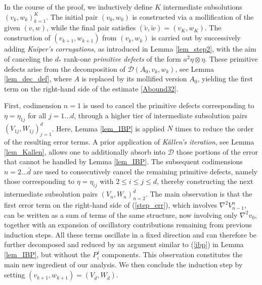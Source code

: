\documentclass[reqno,twoside,11pt]{amsart}
\numberwithin{equation}{section}
\theoremstyle{plain}
\theoremstyle{definition}
\begin{document}
\medskip

\noindent In the course of the proof, we inductively define $K$
intermediate subsolutions ${(v_k, w_k)}_{k=1}^K$. The initial pair
$(v_0, w_0)$ is constructed via a mollification of the given $(v,w)$,
while the final pair satisfies $(\tilde v, \tilde w) = (v_K, w_K)$. 
The construction of $(v_{k+1}, w_{k+1})$ from $(v_k, w_k)$ is carried
out by successively adding {\em Kuiper's corrugations}, as introduced
in Lemma \ref{lem_step2}, with the aim of canceling the $d_*$ rank-one
{\em primitive defects} of the form $a^2 \eta \otimes \eta$. These
primitive defects arise from the decomposition of 
$\mathcal{D}(A_0, v_k, w_k)$, see Lemma \ref{lem_dec_def}, where $A$
is replaced by its mollified version $A_0$, yielding the first term on
the right-hand side of the estimate \ref{Abound32}. 

\medskip

\noindent First, codimension $n=1$ is used to cancel the primitive
defects corresponding to $\eta = \eta_{1j}$ for all $j=1\ldots d$,
through a higher tier of intermediate subsolution pairs ${(V_{1j},
  W_{1j})}_{j=1}^d$. Here, Lemma \ref{lem_IBP} is applied $N$ times to
reduce the order of the resulting error terms. A prior application of
{\em K\"allen's iteration}, see Lemma \ref{lem_Kallen}, allows one to
additionally absorb into $\mathcal{D}$ those portions of the error
that cannot be handled by Lemma \ref{lem_IBP}. 
The subsequent codimensions $n=2 \ldots\bar d$ are 
used to consecutively cancel the remaining primitive defects, namely
those corresponding to $\eta = \eta_{ij}$ with $2 \leq i \leq j \leq d$, 
thereby constructing the next intermediate subsolution pairs ${(V_n, W_n)}_{n=2}^{\bar d}$.  
The main observation is that the first error term on the right-hand
side of (\ref{step_err}), which involves $\nabla^2 V_{n-1}^n$, can be
written as a sum of terms of the same structure, now involving only
$\nabla^2 v_0$, together with an expansion of oscillatory
contributions remaining from previous induction steps. All these terms oscillate
in a fixed direction and can therefore be further decomposed and
reduced by an argument similar to (\ref{ibp}) in Lemma \ref{lem_IBP}, but without the $P_i^j$
components. This observation constitutes the main new ingredient of our analysis. 
We then conclude the induction step by setting $(v_{k+1}, w_{k+1}) =(V_{\bar d}, W_{\bar d})$. 

\medskip
\end{document}
